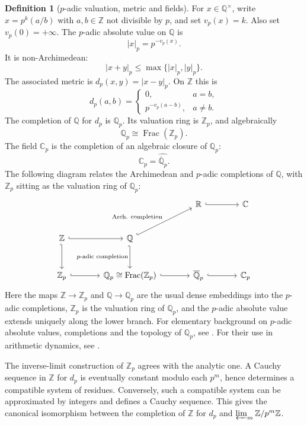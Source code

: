 \documentclass[10pt]{amsart}
\newcommand{\Z}{\mathbb{Z}}
\newcommand{\Q}{\mathbb{Q}}
\newcommand{\R}{\mathbb{R}}
\newcommand{\C}{\mathbb{C}}
\newcommand{\Zp}{\mathbb{Z}_p}
\newcommand{\Qp}{\mathbb{Q}_p}
\newcommand{\Qpalg}{\overline{\Q}_p}
\newcommand{\Cp}{\mathbb{C}_p}
\theoremstyle{plain}
\theoremstyle{definition}
\newtheorem{definition}[theorem]{Definition}
\begin{document}
\begin{definition}[$p$-adic valuation, metric and fields]
For $x\in\Q^\times$, write $x=p^k(a/b)$ with $a,b\in\Z$ not divisible by $p$,
and set $v_p(x)=k$. Also set $v_p(0)=+\infty$. The $p$-adic absolute value on
$\Q$ is
\[
  |x|_p=p^{-v_p(x)}.
\]
It is non-Archimedean:
\[
  |x+y|_p\le \max\{|x|_p,|y|_p\}.
\]
The associated metric is $d_p(x,y)=|x-y|_p$. On $\Z$ this is
\[
  d_p(a,b)=
  \begin{cases}
  0, & a=b,\\
  p^{-v_p(a-b)}, & a\ne b.
  \end{cases}
\]
The completion of $\Q$ for $d_p$ is $\Qp$. Its valuation ring is $\Zp$, and
algebraically
\[
  \Qp\cong\operatorname{Frac}(\Zp).
\]
The field $\Cp$ is the completion of an algebraic closure of $\Qp$:
\[
  \Cp=\widehat{\Qpalg}.
\]
The following diagram relates the Archimedean and $p$-adic completions of
$\Q$, with $\Zp$ sitting as the valuation ring of $\Qp$:
\[
\begin{tikzcd}[column sep=large,row sep=large]
& & \R \arrow[r, hook] & \C \\
\Z \arrow[r, hook] \arrow[d, hook'] &
\Q \arrow[ur, hook, "\text{Arch. completion}"] \arrow[d, hook',
  "\text{$p$-adic completion}"'] & & \\
\Zp \arrow[r, hook] &
\Qp\cong\operatorname{Frac}(\Zp) \arrow[r, hook] &
\Qpalg \arrow[r, hook] &
\Cp
\end{tikzcd}
\]
Here the maps $\Z\to\Zp$ and $\Q\to\Qp$ are the usual dense embeddings into the
$p$-adic completions, $\Zp$ is the valuation ring of $\Qp$, and the $p$-adic
absolute value extends uniquely along the lower branch.
For elementary background on $p$-adic absolute values, completions and the
topology of $\Qp$, see \cite{GouveaPadic}. For their use in arithmetic dynamics,
see \cite{SilvermanADS,BenedettoNAM}.
\end{definition}

The inverse-limit construction of $\Zp$ agrees with the analytic one. A Cauchy
sequence in $\Z$ for $d_p$ is eventually constant modulo each $p^m$, hence
determines a compatible system of residues. Conversely, such a compatible
system can be approximated by integers and defines a Cauchy sequence. This gives
the canonical isomorphism between the completion of $\Z$ for $d_p$ and
$\varprojlim_m\Z/p^m\Z$.
\end{document}
